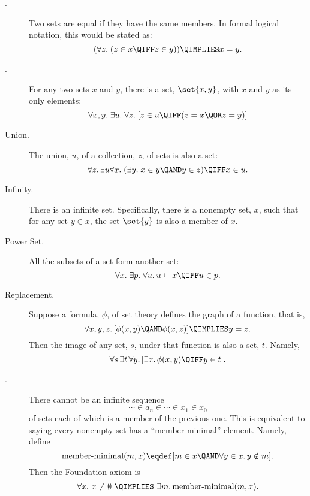 \begin{description}

\item[.] Two sets are equal if they have the same members.
In formal logical notation, this would be stated as:
\[
(\forall z.\; (z \in x \QIFF z \in y)) \QIMPLIES x = y.
\]

\item[.] For any two sets $x$ and $y$, there is a set,
     $\set{x,y}$, with $x$ and $y$ as its only elements:
\[
\forall x,y.\; \exists u.\; \forall z.\;
[z \in u \QIFF (z = x \QOR z = y)]
\]

\item[Union.] The union, $u$, of a collection, $z$, of sets is also a set:
\[
\forall z.\, \exists u \forall x.\; (\exists y.\; x \in y \QAND y \in z) \QIFF x \in u.
\]

\item[Infinity.]  There is an infinite set.
  Specifically, there is a nonempty set, $x$, such that for any set $y \in
  x$, the set $\set{y}$ is also a member of $x$.


\item[Power Set.]  All the subsets of a set form another set:
\[
\forall x.\; \exists p.\; \forall u.\: u \subseteq x \QIFF u \in p.
\]

\item[Replacement.]  Suppose a formula, $\phi$,
  of set theory defines the graph of a function, that is,
\[
\forall x, y, z.\, [\phi(x,y) \QAND \phi(x,z)] \QIMPLIES y = z.
\]
Then the image of any set, $s$, under that function is also a set, $t$.  Namely,
\[
\forall s\, \exists t\, \forall y.\, [\exists x.\, \phi(x,y) \QIFF y \in t].
\]


\item[.] 
There cannot be an infinite sequence
\[
\cdots \in a_n \in \cdots \in x_1 \in x_0
\]
of sets each of which is a member of the previous one.  This is equivalent
to saying every nonempty set has a ``member-minimal'' element.  Namely, define
\[
\text{member-minimal}(m, x) \eqdef [m \in x \QAND \forall y \in x.\, y \notin m].
\]
Then the Foundation axiom is
\[
\forall x.\ x \neq \emptyset\ \QIMPLIES\ \exists m.\, \text{member-minimal}(m, x).
\]


\end{description}
